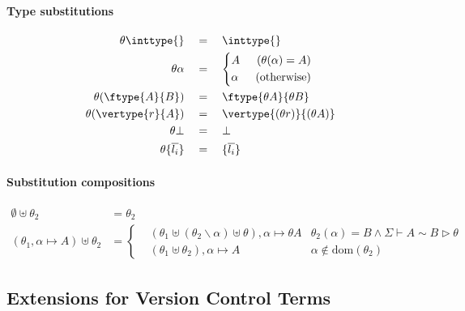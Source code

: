 \paragraph{\textnormal{\textbf{Type substitutions}}}
\begin{align*}
\theta \inttype{} \quad&= \quad \inttype{}\\
\theta\alpha \quad&= \quad
    \left\{\begin{aligned}
    A \hspace{1.5em} (\theta(\alpha)=A)\\
    \alpha \hspace{1.5em} (\mathrm{otherwise})
    \end{aligned}\right.\\
\theta(\ftype{A}{B}) \quad&= \quad \ftype{\theta A}{\theta B}\\
\theta(\vertype{r}{A}) \quad&= \quad \vertype{(\theta r)}{(\theta A)}\\
\theta \bot \quad&= \quad \bot \\
\theta \{\overline{l_i}\} \quad&= \quad \{\overline{l_i}\}
\end{align*}

\paragraph{\textnormal{\textbf{Substitution compositions}}}
\begin{align*}
\emptyset \uplus \theta_2 &= \theta_2\\
(\theta_1, \alpha \mapsto A) \uplus \theta_2 &= \left\{\begin{aligned}
    &(\theta_1 \uplus (\theta_2 \backslash \alpha) \uplus \theta), \alpha \mapsto \theta A &\theta_2(\alpha) = B \land \Sigma \vdash A \sim B \rhd \theta\\
    &(\theta_1 \uplus \theta_2),\alpha \mapsto A &\alpha\notin  \mathrm{dom}(\theta_2)
\end{aligned} \right.
\end{align*}




\subsection{Extensions for Version Control Terms}
\label{appendix:vlmini_version_control_terms}
